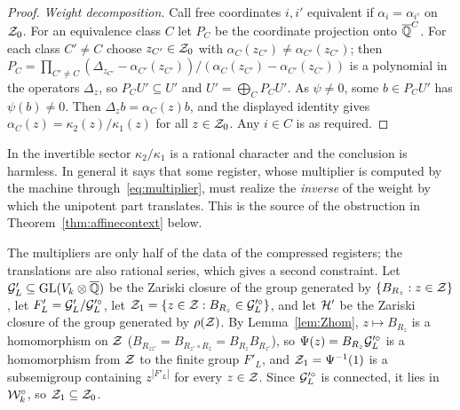 \begin{proof}
\emph{Weight decomposition.} Call free coordinates $i,i'$ equivalent if $\alpha_i=\alpha_{i'}$ on $\mathcal{Z}_0$. For an equivalence class $C$ let $P_C$ be the coordinate projection onto $\overline{\mathbb{Q}}^C$. For each class $C'\ne C$ choose $z_{C'}\in\mathcal{Z}_0$ with $\alpha_C(z_{C'})\ne\alpha_{C'}(z_{C'})$; then $P_C=\prod_{C'\ne C}(\Delta_{z_{C'}}-\alpha_{C'}(z_{C'}))/(\alpha_C(z_{C'})-\alpha_{C'}(z_{C'}))$ is a polynomial in the operators $\Delta_z$, so $P_CU'\subseteq U'$ and $U'=\bigoplus_CP_CU'$. As $\psi\ne0$, some $b\in P_CU'$ has $\psi(b)\ne0$. Then $\Delta_zb=\alpha_C(z)b$, and the displayed identity gives $\alpha_C(z)=\kappa_2(z)/\kappa_1(z)$ for all $z\in\mathcal{Z}_0$. Any $i\in C$ is as required.
\end{proof}

In the invertible sector $\kappa_2/\kappa_1$ is a rational character and the conclusion is harmless. In general it says that some register, whose multiplier is computed by the machine through~\eqref{eq:multiplier}, must realize the \emph{inverse} of the weight by which the unipotent part translates. This is the source of the obstruction in Theorem~\ref{thm:affinecontext} below.

The multipliers are only half of the data of the compressed registers; the translations are also rational series, which gives a second constraint. Let $\mathcal{G}'_L\subseteq\mathrm{GL}(V_k\otimes\overline{\mathbb{Q}})$ be the Zariski closure of the group generated by $\{B_{R_z}:z\in\mathcal{Z}\}$, let $F'_L=\mathcal{G}'_L/\mathcal{G}'^\circ_L$, let $\mathcal{Z}_1=\{z\in\mathcal{Z}:B_{R_z}\in\mathcal{G}'^\circ_L\}$, and let $\mathcal{H}'$ be the Zariski closure of the group generated by $\rho(\mathcal{Z})$. By Lemma~\ref{lem:Zhom}, $z\mapsto B_{R_z}$ is a homomorphism on $\mathcal{Z}$ ($B_{R_{zz'}}=B_{R_{z'}\circ R_z}=B_{R_z}B_{R_{z'}}$), so $\Psi(z)=B_{R_z}\mathcal{G}'^\circ_L$ is a homomorphism from $\mathcal{Z}$ to the finite group $F'_L$, and $\mathcal{Z}_1=\Psi^{-1}(1)$ is a subsemigroup containing $z^{|F'_L|}$ for every $z\in\mathcal{Z}$. Since $\mathcal{G}'^\circ_L$ is connected, it lies in $\mathcal{W}_k^\circ$, so $\mathcal{Z}_1\subseteq\mathcal{Z}_0$.

